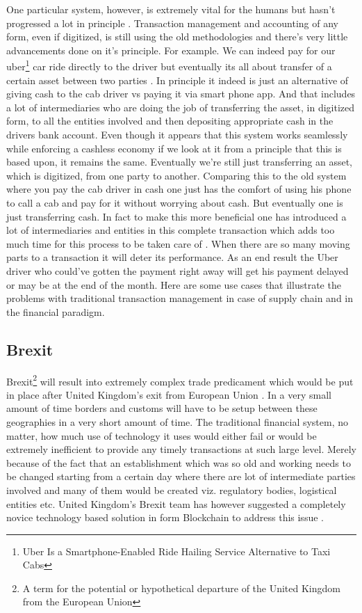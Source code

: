 One particular system, however, is extremely vital for the humans but hasn't progressed a lot in principle \cite{lionelshriver2}. Transaction management and accounting of any form, even if digitized, is still using the old methodologies and there's very little advancements done on it's principle. For example. We can indeed pay for our uber\footnote{Uber Is a Smartphone-Enabled Ride Hailing Service Alternative to Taxi Cabs} car ride directly to the driver but eventually its all about transfer of a certain asset between two parties \cite{uber3}. In principle it indeed is just an alternative of giving cash to the cab driver vs paying it via smart phone app. And that includes a lot of intermediaries who are doing the job of transferring the asset, in digitized form, to all the entities involved and then depositing appropriate cash in the drivers bank account. Even though it appears that this system works seamlessly while enforcing a cashless economy if we look at it from a principle that this is based upon, it remains the same. Eventually we're still just transferring an asset, which is digitized, from one party to another. Comparing this to the old system where you pay the cab driver in cash one just has the comfort of using his phone to call a cab and pay for it without worrying about cash. But eventually one is just transferring cash. In fact to make this more beneficial one has introduced a lot of intermediaries and entities in this complete transaction which adds too much time for this process to be taken care of \cite{tapscott1}. When there are so many moving parts to a transaction it will deter its performance. As an end result the Uber driver who could've gotten the payment right away will get his payment delayed or may be at the end of the month. Here are some use cases that illustrate the problems with traditional transaction management in case of supply chain and in the financial paradigm.

\subsection{Brexit}

Brexit\footnote{A term for the potential or hypothetical departure of the United Kingdom from the European Union} will result into extremely complex trade predicament which would be put in place after United Kingdom's exit from European Union \cite{nicolasbotton4}. In a very small amount of time borders and customs will have to be setup between these geographies in a very short amount of time. The traditional financial system, no matter, how much use of technology it uses would either fail or would be extremely inefficient to provide any timely transactions at such large level. Merely because of the fact that an establishment which was so old and working needs to be changed starting from a certain day where there are lot of intermediate parties involved and many of them would be created viz. regulatory bodies, logistical entities etc. United Kingdom's Brexit team has however suggested a completely novice technology based solution in form Blockchain to address this issue \cite{nicolasbotton4}.

